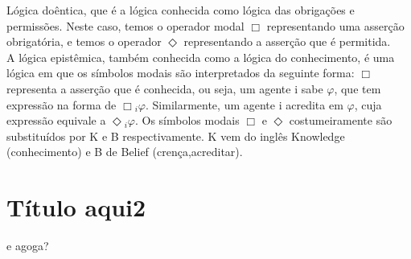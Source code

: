 \documentclass[12pt]{report}
\begin{document}
       \indent Lógica doêntica, que é a lógica conhecida como lógica das obrigações e permissões. Neste caso, temos o operador modal $\Box$ representando uma asserção obrigatória, e temos o operador $\Diamond$ representando a asserção que é permitida.\\
          \indent A lógica epistêmica, também conhecida como a lógica do conhecimento, é uma lógica em que os símbolos modais são interpretados da seguinte forma: $\Box$ representa a asserção que é conhecida, ou seja, um agente i sabe $\varphi$, que tem expressão na forma de $\Box$$_{i}$$\varphi$. Similarmente, um agente i acredita  em $\varphi$, cuja expressão equivale a $\Diamond$$_{i}$$\varphi$. Os símbolos modais  $\Box$ e $\Diamond$ costumeiramente são substituídos por K e B respectivamente. K vem do inglês Knowledge (conhecimento) e B de Belief (crença,acreditar).\\
\section{Título aqui2}e agoga?
\end{document}
